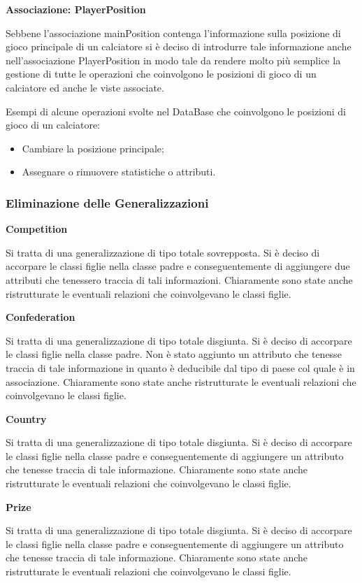 \textbf{Associazione: PlayerPosition}

Sebbene l'associazione mainPosition contenga l'informazione sulla posizione di gioco principale
di un calciatore si è deciso di introdurre tale informazione anche nell'associazione PlayerPosition
in modo tale da rendere molto più semplice la gestione di tutte le operazioni che coinvolgono le
posizioni di gioco di un calciatore ed anche le viste associate.

Esempi di alcune operazioni svolte nel DataBase che coinvolgono le posizioni di gioco di un calciatore:
\begin{itemize}
	\item Cambiare la posizione principale;
	\item Assegnare o rimuovere statistiche o attributi.
\end{itemize}


\newpage
\subsubsection{Eliminazione delle Generalizzazioni}

\textbf{Competition}

Si tratta di una generalizzazione di tipo totale sovrepposta. Si è deciso di accorpare le
classi figlie nella classe padre e conseguentemente di aggiungere due attributi che tenessero traccia
di tali informazioni.
Chiaramente sono state anche ristrutturate le eventuali relazioni che coinvolgevano le classi figlie.

\textbf{Confederation}

Si tratta di una generalizzazione di tipo totale disgiunta. Si è deciso di accorpare le
classi figlie nella classe padre. Non è stato aggiunto un attributo che tenesse traccia
di tale informazione in quanto è deducibile dal tipo di paese col quale è in associazione.
Chiaramente sono state anche ristrutturate le eventuali relazioni che coinvolgevano le classi figlie.

\textbf{Country}

Si tratta di una generalizzazione di tipo totale disgiunta. Si è deciso di accorpare le
classi figlie nella classe padre e conseguentemente di aggiungere un attributo che tenesse traccia
di tale informazione.
Chiaramente sono state anche ristrutturate le eventuali relazioni che coinvolgevano le classi figlie.

\textbf{Prize}

Si tratta di una generalizzazione di tipo totale disgiunta. Si è deciso di accorpare le
classi figlie nella classe padre e conseguentemente di aggiungere un attributo che tenesse traccia
di tale informazione.
Chiaramente sono state anche ristrutturate le eventuali relazioni che coinvolgevano le classi figlie.

